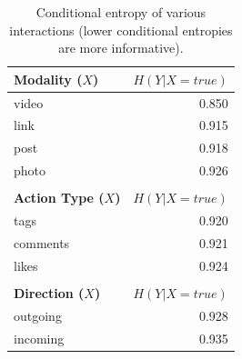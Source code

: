 

\begin{table}
\centering
{\footnotesize
    \begin{tabular}{| >{\small}l | >{\small}r | }
        \hline
        \textbf{ Modality ($X$)} & $H(Y|X=true)$ \\
        \hline
        { video } & 0.850 \\
        \hline
        { link } & 0.915 \\
        \hline
        { post } & 0.918 \\
        \hline
        { photo } & 0.926 \\
        \hline
\multicolumn{2}{c}{}\\
        \hline
        \textbf{Action Type ($X$)}  & $H(Y|X=true)$ \\
        \hline
        { tags }  &  0.920 \\
        \hline
        { comments }  &  0.921 \\
        \hline
        { likes }  &  0.924 \\
        \hline
\multicolumn{2}{c}{}\\
        \hline
        \textbf{ Direction ($X$) } & $H(Y|X=true)$ \\
        \hline
        { outgoing }  &  0.928 \\
        \hline
        { incoming }  &  0.935 \\
        \hline
	\end{tabular}}
	\caption{Conditional entropy of various interactions (lower conditional
	entropies are more informative).}
	\label{table:ce_interaction}
	\vspace{-2mm}
\end{table}
%   
